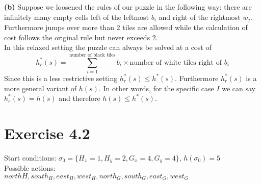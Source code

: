 \documentclass[11pt,a4paper]{article}
\begin{document}
\textbf{(b)} Suppose we loosened the rules of our puzzle in the following way: there are infinitely many empty cells left of the leftmost $b_i$ and right of the rightmost $w_j$. Furthermore jumps over more than 2 tiles are allowed while the calculation of cost follows the original rule but never exceeds 2.\\
In this relaxed setting the puzzle can always be solved at a cost of\\
\begin{equation*}
h_r^*(s) = \sum_{i=1}^{\text{number of black tiles}} b_i\times \text{number of white tiles right of }b_i
\end{equation*}
Since this is a less restrictive setting $h_r^*(s)\leq h^*(s)$. Furthermore $h_r^*(s)$ is a more general variant of $h(s)$. In other words, for the specific case $I$ we can say $h_r^*(s)=h(s)$ and therefore $h(s)\leq h^*(s)$.

\section*{Exercise 4.2}
Start conditions: $\sigma_0 =\{H_x=1, H_y=2, G_x=4, G_y=4\}$, $h(\sigma_0)=5$\\
Possible actions:\\$northH, south_H, east_H, west_H, north_G, south_G, east_G, west_G$\\
\end{document}

